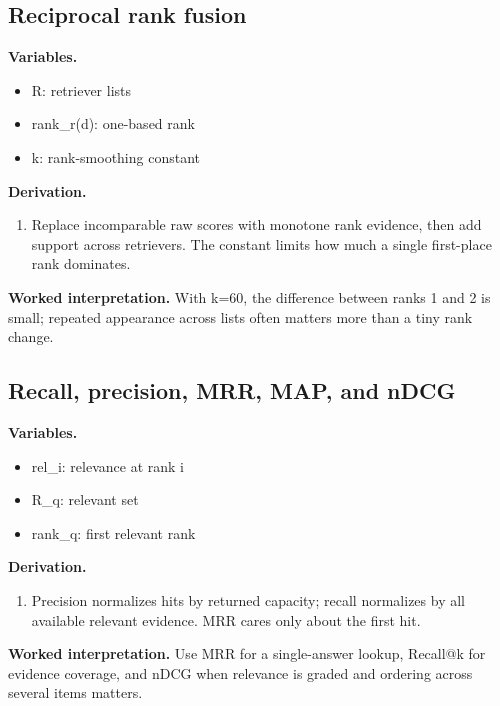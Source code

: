 \subsection{Reciprocal rank fusion}
\textbf{Variables.}\begin{itemize}
\item R: retriever lists
\item rank\_r(d): one-based rank
\item k: rank-smoothing constant
\end{itemize}
\textbf{Derivation.}\begin{derivation}\begin{enumerate}
\item Replace incomparable raw scores with monotone rank evidence, then add support across retrievers. The constant limits how much a single first-place rank dominates.
\end{enumerate}\end{derivation}
\textbf{Worked interpretation.} With k=60, the difference between ranks 1 and 2 is small; repeated appearance across lists often matters more than a tiny rank change.
\subsection{Recall, precision, MRR, MAP, and nDCG}
\textbf{Variables.}\begin{itemize}
\item rel\_i: relevance at rank i
\item R\_q: relevant set
\item rank\_q: first relevant rank
\end{itemize}
\textbf{Derivation.}\begin{derivation}\begin{enumerate}
\item Precision normalizes hits by returned capacity; recall normalizes by all available relevant evidence. MRR cares only about the first hit.
\end{enumerate}\end{derivation}
\textbf{Worked interpretation.} Use MRR for a single-answer lookup, Recall@k for evidence coverage, and nDCG when relevance is graded and ordering across several items matters.
